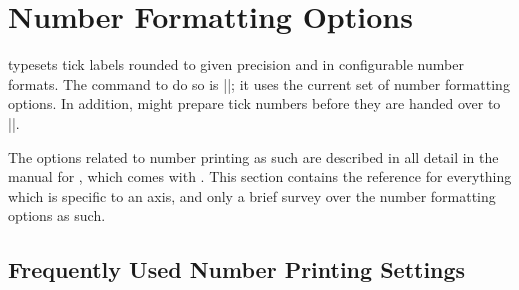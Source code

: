 
\section{Number Formatting Options}
\label{sec:number:printing}

\PGFPlots{} typesets tick labels rounded to given precision and in configurable
number formats. The command to do so is |\pgfmathprintnumber|; it uses the
current set of number formatting options. In addition, \PGFPlots{} might
prepare tick numbers before they are handed over to |\pgfmathprintnumber|.

The options related to number printing as such are described in all detail in
the manual for \PGFPlotstable{}, which comes with \PGFPlots{}. This section
contains the reference for everything which is specific to an axis, and only a
brief survey over the number formatting options as such.


\subsection{Frequently Used Number Printing Settings}
\label{sec:number:faq}

